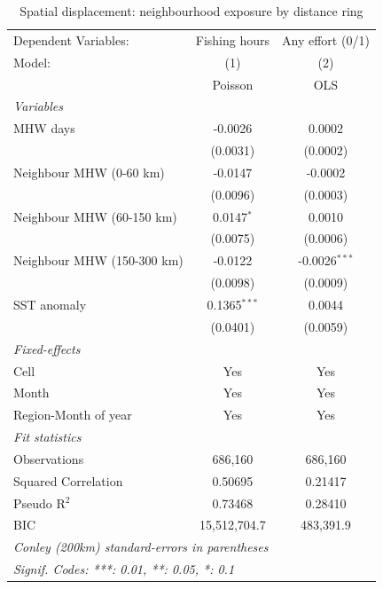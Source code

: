 
\begin{table}[htbp]
   \caption{\label{tab:spill} Spatial displacement: neighbourhood exposure by distance ring}
   \centering
   \begin{tabular}{lcc}
      \tabularnewline \midrule \midrule
      Dependent Variables:       & Fishing hours  & Any effort (0/1)\\  
      Model:                     & (1)            & (2)\\  
                                 &  Poisson       & OLS\\  
      \midrule
      \emph{Variables}\\
      MHW days                   & -0.0026        & 0.0002\\   
                                 & (0.0031)       & (0.0002)\\   
      Neighbour MHW (0-60 km)    & -0.0147        & -0.0002\\   
                                 & (0.0096)       & (0.0003)\\   
      Neighbour MHW (60-150 km)  & 0.0147$^{*}$   & 0.0010\\   
                                 & (0.0075)       & (0.0006)\\   
      Neighbour MHW (150-300 km) & -0.0122        & -0.0026$^{***}$\\   
                                 & (0.0098)       & (0.0009)\\   
      SST anomaly                & 0.1365$^{***}$ & 0.0044\\   
                                 & (0.0401)       & (0.0059)\\   
      \midrule
      \emph{Fixed-effects}\\
      Cell                       & Yes            & Yes\\  
      Month                      & Yes            & Yes\\  
      Region-Month of year       & Yes            & Yes\\  
      \midrule
      \emph{Fit statistics}\\
      Observations               & 686,160        & 686,160\\  
      Squared Correlation        & 0.50695        & 0.21417\\  
      Pseudo R$^2$               & 0.73468        & 0.28410\\  
      BIC                        & 15,512,704.7   & 483,391.9\\  
      \midrule \midrule
      \multicolumn{3}{l}{\emph{Conley (200km) standard-errors in parentheses}}\\
      \multicolumn{3}{l}{\emph{Signif. Codes: ***: 0.01, **: 0.05, *: 0.1}}\\
   \end{tabular}
\end{table}


